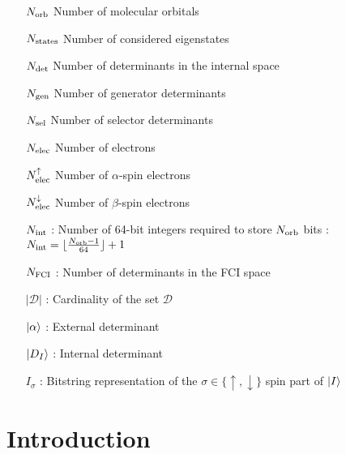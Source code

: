 \documentclass[12pt,a4paper]{report}
\begin{document}
\begin{itemize}

\item [${N_\text{orb}}$] Number of molecular orbitals

\item [${N_\text{states}}$] Number of considered eigenstates

\item [${N_\text{det}}$] Number of determinants in the internal space

\item [${N_\text{gen}}$] Number of generator determinants 

\item [${N_\text{sel}}$] Number of selector determinants

\item [${N_\text{elec}}$] Number of electrons

\item [${N_\text{elec}^{\uparrow}}$] Number of $\alpha$-spin electrons

\item [${N_\text{elec}^{\downarrow}}$] Number of $\beta$-spin electrons

\item [${N_\text{int}}$] : Number of 64-bit integers required to store ${N_\text{orb}}$ bits : 
${{N_\text{int}} = \lfloor \frac{{N_\text{orb}}-1}{64} \rfloor + 1}$

%

\item [$N_\text{FCI}$] : Number of determinants in the FCI space

\item [$|\mathcal{D}|$] : Cardinality of the set $\mathcal{D}$

\item [${\ket{\alpha}}$] : External determinant

\item [$\ket {D_I}$] : Internal determinant

\item [$I_\sigma$] : Bitstring representation of the $\sigma \in \{\uparrow, \downarrow \}$ spin part of $\ket I$


\end{itemize}





\chapter{Introduction}
\end{document}
